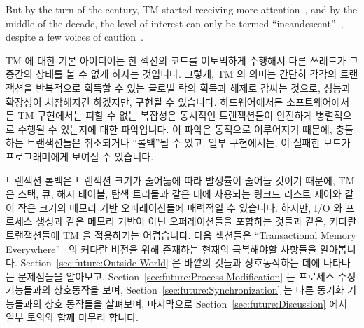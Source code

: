 But by the turn of the century, TM started receiving
more attention~\cite{Martinez01a,Rajwar01a}, and by the middle of the
decade, the level of interest can only be termed
``incandescent''~\cite{MauriceHerlihy2005-TM-manifesto.pldi,
DanGrossman2007TMGCAnalogy}, despite a few voices of
caution~\cite{Blundell2005DebunkTM,McKenney2007PLOSTM}.
\fi

TM 에 대한 기본 아이디어는 한 섹션의 코드를 어토믹하게 수행해서 다른 쓰레드가
그 중간의 상태를 볼 수 없게 하자는 것입니다.
그렇게, TM 의 의미는 간단히 각각의 트랜잭션을 반복적으로 획득할 수 있는 글로벌
락의 획득과 해제로 감싸는 것으로, 성능과 확장성이 처참해지긴 하겠지만, 구현될
수 있습니다.
하드웨어에서든 소프트웨어에서든 TM 구현에서는 피할 수 없는 복잡성은 동시적인
트랜잭션들이 안전하게 병렬적으로 수행될 수 있는지에 대한 파악입니다.
이 파악은 동적으로 이루어지기 때문에, 충돌하는 트랜잭션들은 취소되거나
``롤백''될 수 있고, 일부 구현에서는, 이 실패한 모드가 프로그래머에게 보여질 수
있습니다.

트랜잭션 롤백은 트랜잭션 크기가 줄어듦에 따라 발생률이 줄어들 것이기 때문에, TM
은 스택, 큐, 해시 테이블, 탐색 트리들과 같은 데에 사용되는 링크드 리스트 제어와
같이 작은 크기의 메모리 기반 오퍼레이션들에 매력적일 수 있습니다.
하지만, I/O 와 프로세스 생성과 같은 메모리 기반이 아닌 오퍼레이션들을 포함하는
것들과 같은, 커다란 트랜잭션들에 TM 을 적용하기는 어렵습니다.
다음 섹션들은 ``Transactional Memory
Everywhere''~\cite{PaulEMcKenney2009TMeverywhere} 의 커다란 비전을 위해
존재하는 현재의 극복해야할 사항들을 알아봅니다.
Section~\ref{sec:future:Outside World} 은 바깥의 것들과 상호동작하는 데에
나타나는 문제점들을 알아보고,
Section~\ref{sec:future:Process Modification} 는 프로세스 수정 기능들과의
상호동작을 보며,
Section~\ref{sec:future:Synchronization} 는 다른 동기화 기능들과의 상호
동작들을 살펴보며, 마지막으로
Section~\ref{sec:future:Discussion} 에서 일부 토의와 함께 마무리 합니다.
\iffalse

